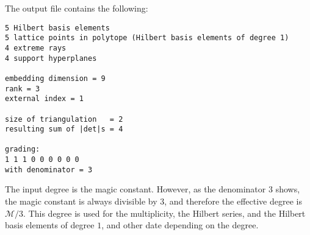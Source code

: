 \documentclass[12pt,a4paper]{scrartcl}
\theoremstyle{definition}
\begin{document}
The output file contains the following:

\begin{Verbatim}
5 Hilbert basis elements
5 lattice points in polytope (Hilbert basis elements of degree 1)
4 extreme rays
4 support hyperplanes

embedding dimension = 9
rank = 3
external index = 1

size of triangulation   = 2
resulting sum of |det|s = 4

grading:
1 1 1 0 0 0 0 0 0 
with denominator = 3
\end{Verbatim}
The input degree is the magic constant. However, as the
denominator $3$ shows, the magic constant is always divisible
by $3$, and therefore the effective degree is $\mathcal M/3$.
This degree is used for the multiplicity, the Hilbert series, and the
Hilbert basis elements of degree $1$, and other date depending on the degree.
\end{document}
